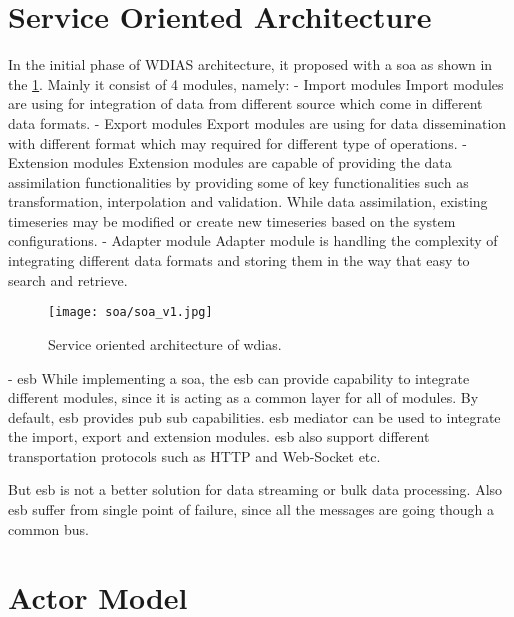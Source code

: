 \section{Service Oriented Architecture}

In the initial phase of WDIAS architecture, it proposed with a \acrfull{soa} as shown in the \ref{fi:proposed_soa}. Mainly it consist of 4 modules, namely:
- Import modules
Import modules are using for integration of data from different source which come in different data formats.
- Export modules
Export modules are using for data dissemination with different format which may required for different type of operations.
- Extension modules
Extension modules are capable of providing the data assimilation functionalities by providing some of key functionalities such as transformation, interpolation and validation. While data assimilation, existing timeseries may be modified or create new timeseries based on the system configurations.
- Adapter module
Adapter module is handling the complexity of integrating different data formats and storing them in the way that easy to search and retrieve.

\begin{figure}[htp]
    \centering
    \texttt{[image: soa/soa\_v1.jpg]}
    \caption{Service oriented architecture of \acrshort{wdias}.}
    \label{fi:proposed_soa}
\end{figure}

- \acrfull{esb}
While implementing a \acrfull{soa}, the \acrfull{esb} can provide capability to integrate different modules, since it is acting as a common layer for all of modules.
By default, \acrshort{esb} provides pub sub capabilities.
\acrshort{esb} mediator can be used to integrate the import, export and extension modules. \acrshort{esb} also support different transportation protocols such as HTTP and Web-Socket etc.

But \acrshort{esb} is not a better solution for data streaming or bulk data processing. Also \acrshort{esb} suffer from single point of failure, since all the messages are going though a common bus.

\section{Actor Model}

